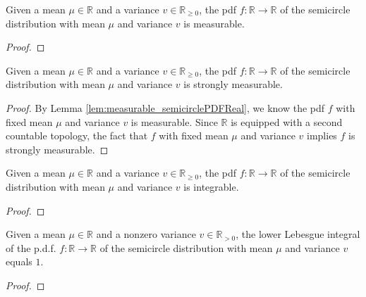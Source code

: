 \begin{lemma}\label{lem:measurable_semicirclePDFReal}
    \uses{}
    \notready
    Given a mean $\mu \in \mathbb{R}$ and a variance $v \in \mathbb{R}_{\geq 0}$, the pdf $f : \mathbb{R} \rightarrow \mathbb{R}$ 
    of the semicircle distribution with mean $\mu$ and variance $v$ is measurable.
\end{lemma}
\begin{proof}
\end{proof}
\begin{lemma}\label{lem:stronglyMeasurable_semicirclePDFReal}
    \mathlibok
    Given a mean $\mu \in \mathbb{R}$ and a variance $v \in \mathbb{R}_{\geq 0}$, the pdf $f : \mathbb{R} \rightarrow \mathbb{R}$ 
    of the semicircle distribution with mean $\mu$ and variance $v$ is strongly measurable.
\end{lemma}
\begin{proof}
    By Lemma \ref{lem:measurable_semicirclePDFReal}, we know the pdf $f$ with fixed mean $\mu$ and variance $v$ is measurable.
    Since $\mathbb{R}$ is equipped with a second countable topology, the fact that $f$ with fixed mean $\mu$ and variance $v$ implies $f$ is strongly measurable.  
\end{proof}
\begin{lemma}\label{lem:integrable_semicirclePDFReal}
    \notready
    Given a mean $\mu \in \mathbb{R}$ and a variance $v \in \mathbb{R}_{\geq 0}$, the pdf $f : \mathbb{R} \rightarrow \mathbb{R}$ 
    of the semicircle distribution with mean $\mu$ and variance $v$ is integrable.
\end{lemma}
\begin{proof}
\end{proof}
\begin{lemma}\label{lem:lintegral_semicirclePDFReal_eq_one}
    \notready
    Given a mean $\mu \in \mathbb{R}$ and a nonzero variance $v \in \mathbb{R}_{> 0}$, the lower Lebesgue integral of the p.d.f. $f : \mathbb{R} \rightarrow \mathbb{R}$ 
    of the semicircle distribution with mean $\mu$ and variance $v$ equals $1$.
\end{lemma}
\begin{proof}
\end{proof}
